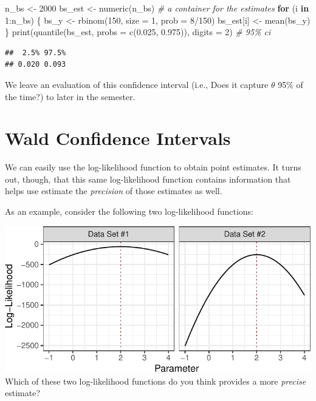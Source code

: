 \documentclass[
]{book}
\newenvironment{Shaded}{\begin{snugshade}}{\end{snugshade}}
\newcommand{\AttributeTok}[1]{\textcolor[rgb]{0.77,0.63,0.00}{#1}}
\newcommand{\CommentTok}[1]{\textcolor[rgb]{0.56,0.35,0.01}{\textit{#1}}}
\newcommand{\ControlFlowTok}[1]{\textcolor[rgb]{0.13,0.29,0.53}{\textbf{#1}}}
\newcommand{\DecValTok}[1]{\textcolor[rgb]{0.00,0.00,0.81}{#1}}
\newcommand{\FloatTok}[1]{\textcolor[rgb]{0.00,0.00,0.81}{#1}}
\newcommand{\FunctionTok}[1]{\textcolor[rgb]{0.00,0.00,0.00}{#1}}
\newcommand{\NormalTok}[1]{#1}
\newcommand{\OtherTok}[1]{\textcolor[rgb]{0.56,0.35,0.01}{#1}}
\newcommand{\SpecialCharTok}[1]{\textcolor[rgb]{0.00,0.00,0.00}{#1}}
\begin{document}
\begin{Shaded}
\begin{Highlighting}[]
\NormalTok{n\_bs }\OtherTok{\textless{}{-}} \DecValTok{2000}
\NormalTok{bs\_est }\OtherTok{\textless{}{-}} \FunctionTok{numeric}\NormalTok{(n\_bs)  }\CommentTok{\# a container for the estimates}
\ControlFlowTok{for}\NormalTok{ (i }\ControlFlowTok{in} \DecValTok{1}\SpecialCharTok{:}\NormalTok{n\_bs) \{}
\NormalTok{  bs\_y }\OtherTok{\textless{}{-}} \FunctionTok{rbinom}\NormalTok{(}\DecValTok{150}\NormalTok{, }\AttributeTok{size =} \DecValTok{1}\NormalTok{, }\AttributeTok{prob =} \DecValTok{8}\SpecialCharTok{/}\DecValTok{150}\NormalTok{)}
\NormalTok{  bs\_est[i] }\OtherTok{\textless{}{-}} \FunctionTok{mean}\NormalTok{(bs\_y)}
\NormalTok{\}}
\FunctionTok{print}\NormalTok{(}\FunctionTok{quantile}\NormalTok{(bs\_est, }\AttributeTok{probs =} \FunctionTok{c}\NormalTok{(}\FloatTok{0.025}\NormalTok{, }\FloatTok{0.975}\NormalTok{)), }\AttributeTok{digits =} \DecValTok{2}\NormalTok{)  }\CommentTok{\# 95\% ci}
\end{Highlighting}
\end{Shaded}

\begin{verbatim}
##  2.5% 97.5% 
## 0.020 0.093
\end{verbatim}

We leave an evaluation of this confidence interval (i.e., Does it
capture \(\theta\) 95\% of the time?) to later in the semester.

\hypertarget{wald-confidence-intervals}{%
\section{Wald Confidence Intervals}\label{wald-confidence-intervals}}

We can easily use the log-likelihood function to obtain point estimates.
It turns out, though, that this same log-likelihood function contains
information that helps use estimate the \emph{precision} of those
estimates as well.

As an example, consider the following two log-likelihood functions:

\includegraphics{04-02-wald-cis_files/figure-latex/unnamed-chunk-2-1.pdf}
Which of these two log-likelihood functions do you think provides a more
\emph{precise} estimate?
\end{document}
